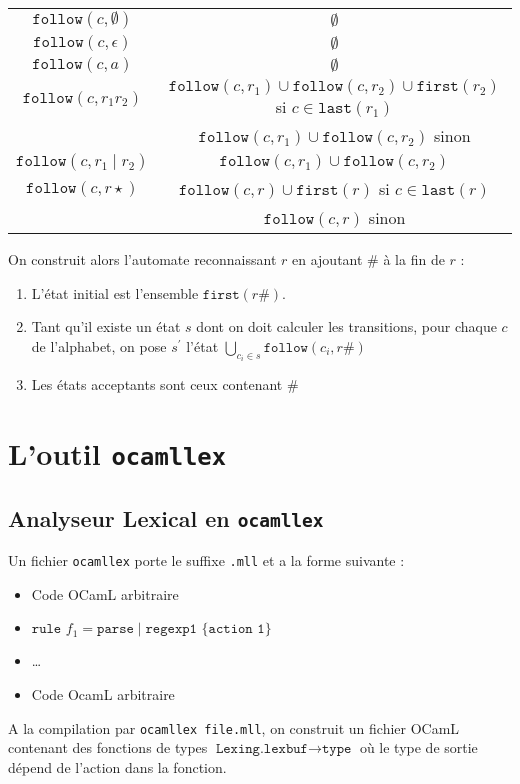 \documentclass{cours}
\begin{document}
\begin{center}
\begin{tabular}{c@{ = }c}
        \midrule
        $\texttt{follow}(c, \emptyset)$ & $\emptyset$\\
        $\texttt{follow}(c, \epsilon)$ & $\emptyset$\\
        $\texttt{follow}(c, a)$ & $\emptyset$\\
        $\texttt{follow}(c, r_{1}r_{2})$ & $\texttt{follow}(c, r_{1}) \cup \texttt{follow}(c, r_{2}) \cup \texttt{first}(r_{2})$ si $c \in \texttt{last}(r_{1})$\\
        & $\texttt{follow}(c, r_{1}) \cup \texttt{follow}(c, r_{2})$ sinon\\
        $\texttt{follow}(c, r_{1} \mid r_{2})$ & $\texttt{follow}(c, r_{1}) \cup \texttt{follow}(c, r_{2})$\\
        $\texttt{follow}(c, r\star)$ & $\texttt{follow}(c, r) \cup \texttt{first}(r)$ si $c\in \texttt{last}(r)$\\
        &$\texttt{follow}(c, r)$ sinon\\
        \bottomrule
    \end{tabular}
\end{center}
On construit alors l'automate reconnaissant $r$ en ajoutant $\#$ à la fin de $r$ : 
\begin{enumerate}
    \item L'état initial est l'ensemble $\texttt{first}(r\#)$.
    \item Tant qu'il existe un état $s$ dont on doit calculer les transitions, pour chaque $c$ de l'alphabet, on pose $s^{'}$ l'état $\bigcup_{c_{i} \in s} \texttt{follow}(c_{i}, r\#)$
    \item Les états acceptants sont ceux contenant $\#$
\end{enumerate}

\section{L'outil \texttt{ocamllex}}
\subsection{Analyseur Lexical en \texttt{ocamllex}}
Un fichier \texttt{ocamllex} porte le suffixe \texttt{.mll} et a la forme suivante : 
\begin{itemize}
    \item Code OCamL arbitraire
    \item $\texttt{rule } f_{1} = \texttt{parse} \mid \texttt{regexp1 } \{\texttt{action 1}\}$ 
    \item \dots
    \item Code OcamL arbitraire
\end{itemize}
A la compilation par \texttt{ocamllex file.mll}, on construit un fichier OCamL contenant des fonctions de types $\texttt{Lexing.lexbuf} \rightarrow \texttt{type}$ où le type de sortie dépend de l'action dans la fonction. \\
\end{document}
